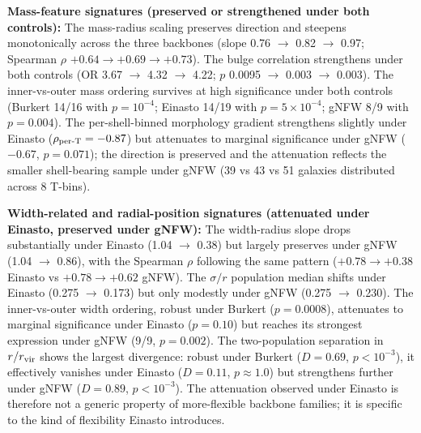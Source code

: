 \documentclass[linenumbers,trackchanges]{aastex701}
\begin{document}
\textbf{Mass-feature signatures (preserved or strengthened under both controls):} The mass-radius scaling preserves direction and steepens monotonically across the three backbones (slope 0.76 $\rightarrow$ 0.82 $\rightarrow$ 0.97; Spearman $\rho$ $+0.64 \to +0.69 \to +0.73$). The bulge correlation strengthens under both controls (OR 3.67 $\rightarrow$ 4.32 $\rightarrow$ 4.22; $p$ 0.0095 $\rightarrow$ 0.003 $\rightarrow$ 0.003). The inner-vs-outer mass ordering survives at high significance under both controls (Burkert 14/16 with $p = 10^{-4}$; Einasto 14/19 with $p = 5\times 10^{-4}$; gNFW 8/9 with $p = 0.004$). The per-shell-binned morphology gradient strengthens slightly under Einasto ($\rho_{\rm per\text{-}T} = -0.87$) but attenuates to marginal significance under gNFW ($-0.67$, $p = 0.071$); the direction is preserved and the attenuation reflects the smaller shell-bearing sample under gNFW (39 vs 43 vs 51 galaxies distributed across 8 T-bins).

\textbf{Width-related and radial-position signatures (attenuated under Einasto, preserved under gNFW):} The width-radius slope drops substantially under Einasto (1.04 $\rightarrow$ 0.38) but largely preserves under gNFW (1.04 $\rightarrow$ 0.86), with the Spearman $\rho$ following the same pattern ($+0.78 \to +0.38$ Einasto vs $+0.78 \to +0.62$ gNFW). The $\sigma/r$ population median shifts under Einasto (0.275 $\rightarrow$ 0.173) but only modestly under gNFW (0.275 $\rightarrow$ 0.230). The inner-vs-outer width ordering, robust under Burkert ($p = 0.0008$), attenuates to marginal significance under Einasto ($p = 0.10$) but reaches its strongest expression under gNFW (9/9, $p = 0.002$). The two-population separation in $r/r_{\rm vir}$ shows the largest divergence: robust under Burkert ($D = 0.69$, $p < 10^{-3}$), it effectively vanishes under Einasto ($D = 0.11$, $p \approx 1.0$) but strengthens further under gNFW ($D = 0.89$, $p < 10^{-3}$). The attenuation observed under Einasto is therefore not a generic property of more-flexible backbone families; it is specific to the kind of flexibility Einasto introduces.
\end{document}
